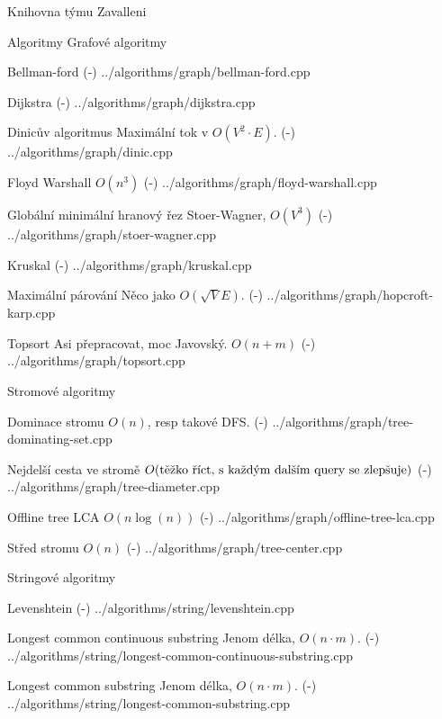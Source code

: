 
\chyph

\hyperlinks{\Blue}{\Green}

\def\newpage{\vfil \break}
\def\linebreak{\hfil \break}
\overfullrule=0pt

\tit Knihovna týmu Zavalleni

\maketoc

\chap Algoritmy
\sec Grafové algoritmy

\def\tthook{\ttline=-2}
\secc Bellman-ford
\verbinput (-) ../algorithms/graph/bellman-ford.cpp

\secc Dijkstra
\verbinput (-) ../algorithms/graph/dijkstra.cpp

\secc Dinicův algoritmus
Maximální tok v $O(V^2 \cdot E)$.
\verbinput (-) ../algorithms/graph/dinic.cpp

\secc Floyd Warshall
$O(n^3)$
\verbinput (-) ../algorithms/graph/floyd-warshall.cpp

\secc Globální minimální hranový řez
Stoer-Wagner, $O(V^3)$
\verbinput (-) ../algorithms/graph/stoer-wagner.cpp

\secc Kruskal
\verbinput (-) ../algorithms/graph/kruskal.cpp

\secc Maximální párování
Něco jako $O(\sqrt{V}E)$.
\verbinput (-) ../algorithms/graph/hopcroft-karp.cpp

\secc Topsort
Asi přepracovat, moc Javovský. $O(n + m)$
\verbinput (-) ../algorithms/graph/topsort.cpp

\sec Stromové algoritmy

\secc Dominace stromu
$O(n)$, resp takové DFS.
\verbinput (-) ../algorithms/graph/tree-dominating-set.cpp

\secc Nejdelší cesta ve stromě
$O(\hbox{těžko říct, s každým dalším query se zlepšuje})$
\verbinput (-) ../algorithms/graph/tree-diameter.cpp

\secc Offline tree LCA
$O(n\log(n))$
\verbinput (-) ../algorithms/graph/offline-tree-lca.cpp

\secc Střed stromu
$O(n)$
\verbinput (-) ../algorithms/graph/tree-center.cpp


\sec Stringové algoritmy

\secc Levenshtein
\verbinput (-) ../algorithms/string/levenshtein.cpp

\secc Longest common continuous substring
Jenom délka, $O(n \cdot m)$.
\verbinput (-) ../algorithms/string/longest-common-continuous-substring.cpp

\secc Longest common substring
Jenom délka, $O(n \cdot m)$.
\verbinput (-) ../algorithms/string/longest-common-substring.cpp

